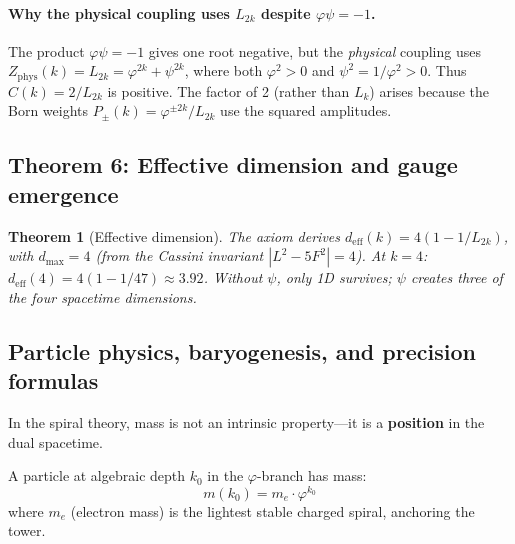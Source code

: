 \documentclass[12pt,a4paper]{article}
\newtheorem{theorem}{Theorem}[section]
\begin{document}
\paragraph{Why the physical coupling uses $L_{2k}$ despite $\varphi\psi = -1$.}
The product $\varphi\psi = -1$ gives one root negative, but the \emph{physical} coupling uses $Z_{\mathrm{phys}}(k) = L_{2k} = \varphi^{2k} + \psi^{2k}$, where both $\varphi^2 > 0$ and $\psi^2 = 1/\varphi^2 > 0$. Thus $C(k) = 2/L_{2k}$ is positive. The factor of 2 (rather than $L_k$) arises because the Born weights $P_\pm(k) = \varphi^{\pm 2k}/L_{2k}$ use the squared amplitudes.

\subsection{Theorem 6: Effective dimension and gauge emergence}

\begin{theorem}[Effective dimension]
\label{thm:effective-dimension}
The axiom derives $d_{\mathrm{eff}}(k) = 4(1 - 1/L_{2k})$, with $d_{\max} = 4$ (from the Cassini invariant $|L^2 - 5F^2| = 4$).  At $k = 4$: $d_{\mathrm{eff}}(4) = 4(1 - 1/47) \approx 3.92$. Without $\psi$, only 1D survives; $\psi$ creates three of the four spacetime dimensions. \label{thm:dimensionality} \label{thm:psi-creates-dimensions}
\end{theorem}



\subsection{Particle physics, baryogenesis, and precision formulas}
\label{sec:particle-baryo-precision}


In the spiral theory, mass is not an intrinsic property---it is a \textbf{position} in the dual spacetime.

A particle at algebraic depth $k_0$ in the $\varphi$-branch has mass:
\begin{equation}
\boxed{m(k_0) = m_e \cdot \varphi^{k_0}}
\end{equation}
where $m_e$ (electron mass) is the lightest stable charged spiral, anchoring the tower.
\end{document}
